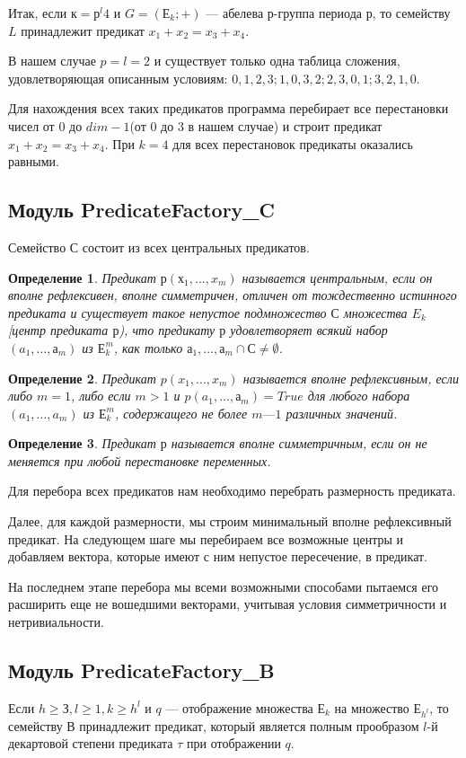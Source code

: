 \documentclass[a4paper,14pt]{extreport}
\newtheorem{opr}{Определение}
\begin{document}
Итак, если $к = р^l4$ и $G = (Е_k; +)$ — абелева $р$-группа периода $р$, то семейству $L$ принадлежит предикат $x_1+x_2=x_3+x_4$. 

В нашем случае $p=l=2$ и существует только одна таблица сложения, удовлетворяющая описанным условиям: ${{0, 1, 2, 3};{1, 0, 3, 2};{2, 3, 0, 1};{3, 2, 1, 0}}$. 

Для нахождения всех таких предикатов программа перебирает все перестановки чисел от $0$ до $dim-1$(от $0$ до $3$ в нашем случае) и строит предикат $x_1+x_2=x_3+x_4$. При $k=4$ для всех перестановок предикаты оказались равными.
\subsection{Модуль PredicateFactory\_C}
Семейство $С$ состоит из всех центральных предикатов.

\begin{opr} Предикат $р(х_1,...,x_m )$ называется центральным, если он вполне рефлексивен, вполне симметричен, отличен от тождественно истинного предиката и существует такое непустое подмножество $С$ множества $E_k$ [центр предиката $р$),  что предикату $р$ удовлетворяет всякий набор $(a_1,..., а_m)$ из $Е_k^m$, как только ${а_1,..., а_m} \cap С \neq \emptyset$.
\end{opr}
\begin{opr}Предикат $p(x_1,..., x_m)$ называется вполне рефлексивным, если либо $m = 1$, либо  если $m > 1$ и $p(a_1,..., а_m) = True$ для любого набора $(a_1,...,a_m)$ из $Е_k^m$, содержащего не более $m — 1$ различных значений.
\end{opr}
\begin{opr} 
Предикат $р$ называется вполне симметричным, если он не меняется при любой перестановке переменных.  
\end{opr}

Для перебора всех предикатов нам необходимо перебрать размерность предиката.

Далее, для каждой размерности, мы строим минимальный вполне рефлексивный предикат.
На следующем шаге мы перебираем все возможные центры и добавляем вектора, которые имеют с ним непустое пересечение, в предикат.

На последнем этапе перебора мы  всеми возможными способами пытаемся его расширить еще не вошедшими векторами, учитывая условия симметричности и нетривиальности.
\subsection{Модуль PredicateFactory\_B}
Если $h \geqslant З, l \geqslant 1, k \geqslant h^l$ и $q$ — отображение множества $Е_k$ на  множество $Е_{h^l}$, то семейству $В$ принадлежит предикат, который является полным прообразом $l$-й декартовой степени предиката $\tau$ при отображении $q$.
\end{document}
